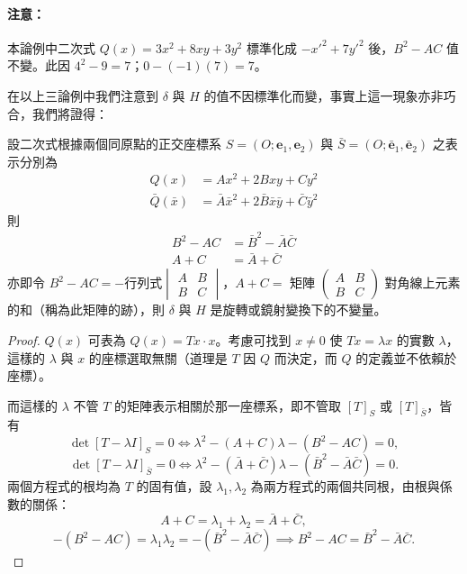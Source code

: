 \paragraph{注意：}
本論例中二次式 $Q(x) = 3x^2 + 8xy + 3y^2$ 標準化成 $-{x'}^2 + 7{y'}^2$ 後，$B^2 - AC$ 值不變。此因 $4^2 - 9 = 7$；$0 - (-1)(7) = 7$。

在以上三論例中我們注意到 $\delta$ 與 $H$ 的值不因標準化而變，事實上這一現象亦非巧合，我們將證得：

\begin{theorem}[不變量定理]
設二次式根據兩個同原點的正交座標系 $S = (O; \mathbf{e}_1, \mathbf{e}_2)$ 與 $\bar{S} = (O; \bar{\mathbf{e}}_1, \bar{\mathbf{e}}_2)$ 之表示分別為
\begin{align}
Q(x) &= Ax^2 + 2Bxy + Cy^2 \label{eq:b4s-ch4-thm2-q1} \\
\bar{Q}(\bar{x}) &= \bar{A}\bar{x}^2 + 2\bar{B}\bar{x}\bar{y} + \bar{C}\bar{y}^2 \label{eq:b4s-ch4-thm2-q2}
\end{align}
則
\begin{equation}
\begin{aligned}
B^2 - AC &= \bar{B}^2 - \bar{A}\bar{C} \\
A + C &= \bar{A} + \bar{C}
\end{aligned}
\label{eq:b4s-ch4-thm2-invariants}
\end{equation}
亦即令 $B^2 - AC = -\text{行列式} \begin{vmatrix} A & B \\ B & C \end{vmatrix}$，$A + C =$ 矩陣 $\begin{pmatrix} A & B \\ B & C \end{pmatrix}$ 對角線上元素的和（稱為此矩陣的跡），則 $\delta$ 與 $H$ 是旋轉或鏡射變換下的不變量。
\end{theorem}

\begin{proof}
$Q(x)$ 可表為 $Q(x) = Tx \cdot x$。考慮可找到 $x \ne 0$ 使 $Tx = \lambda x$ 的實數 $\lambda$，這樣的 $\lambda$ 與 $x$ 的座標選取無關（道理是 $T$ 因 $Q$ 而決定，而 $Q$ 的定義並不依賴於座標）。

而這樣的 $\lambda$ 不管 $T$ 的矩陣表示相關於那一座標系，即不管取 $[T]_S$ 或 $[T]_{\bar{S}}$，皆有
\[
\det[T - \lambda I]_S = 0 \iff \lambda^2 - (A + C)\lambda - (B^2 - AC) = 0,
\]
\[
\det[T - \lambda I]_{\bar{S}} = 0 \iff \lambda^2 - (\bar{A} + \bar{C})\lambda - (\bar{B}^2 - \bar{A}\bar{C}) = 0.
\]
兩個方程式的根均為 $T$ 的固有值，設 $\lambda_1, \lambda_2$ 為兩方程式的兩個共同根，由根與係數的關係：
\[
A + C = \lambda_1 + \lambda_2 = \bar{A} + \bar{C},
\]
\[
-(B^2 - AC) = \lambda_1 \lambda_2 = -(\bar{B}^2 - \bar{A}\bar{C}) \implies B^2 - AC = \bar{B}^2 - \bar{A}\bar{C}.
\]
\end{proof}

